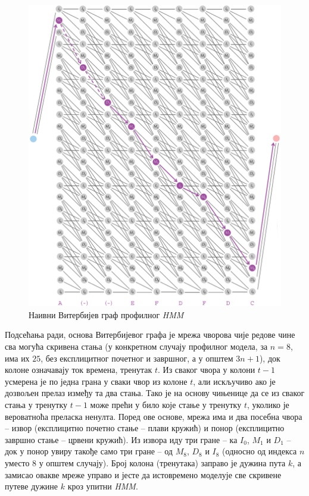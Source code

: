 \documentclass[12pt,oneside]{memoir}
\begin{document}
\begin{CJK}{UTF8}{ipxm}
\begin{figure}[H]
  \centering
  \includegraphics[width=\textwidth]{prof_vit.png}
  \caption{Наивни Витербијев граф профилног \textit{HMM}\cite{compeau2015}}
  \label{fig:prof_vit}
\end{figure}

Подсећања ради, основа Витербијевог графа је мрежа чворова чије редове чине сва могућа скривена стања (у конкретном случају профилног модела, за $n = 8$, има их $25$, без експлицитног почетног и завршног, а у општем $3n+1$), док колоне означавају ток времена, тренутак $t$. Из сваког чвора у колони $t-1$ усмерена је по једна грана у сваки чвор из колоне $t$, али искључиво ако је дозвољен прелаз између та два стања. Тако је на основу чињенице да се из сваког стања у тренутку $t-1$ може прећи у било које стање у тренутку $t$, уколико је вероватноћа преласка ненулта. Поред ове основе, мрежа има и два посебна чвора -- извор (експлицитно почетно стање -- плави кружић) и понор (експлицитно завршно стање -- црвени кружић). Из извора иду три гране -- ка $I_0$, $M_1$ и $D_1$ -- док у понор увиру такође само три гране -- од $M_8$, $D_8$ и $I_8$ (односно од индекса $n$ уместо $8$ у општем случају). Број колона (тренутака) заправо је дужина пута $k$, а замисао овакве мреже управо и јесте да истовремено моделује све скривене путеве дужине $k$ кроз упитни \textit{HMM}.


\end{CJK}
\end{document}
